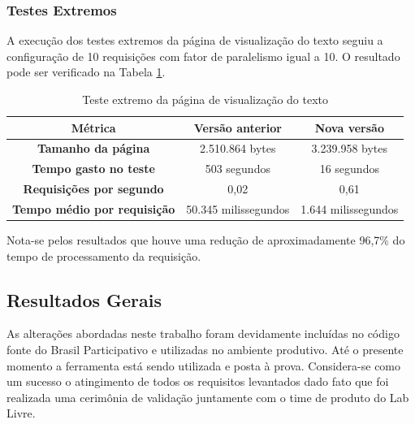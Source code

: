 \subsubsection {Testes Extremos}

A execução dos testes extremos da página de visualização do texto seguiu a configuração de 10 requisições com fator de paralelismo igual a 10.
O resultado pode ser verificado na Tabela \ref{tab:teste-carga-extremo-visualizar-texto}.

\begin{table}[h]
	\centering
	\caption{Teste extremo da página de visualização do texto}
	\label{tab:teste-carga-extremo-visualizar-texto}
	\begin{tabular}{ccc}
		\toprule
		Métrica & Versão anterior & \textbf{Nova versão} \\
		\midrule
    \textbf{Tamanho da página} & 2.510.864 bytes & 3.239.958 bytes \\
    \textbf{Tempo gasto no teste} & 503 segundos & 16 segundos \\
    \textbf{Requisições por segundo} & 0,02 & 0,61 \\
    \textbf{Tempo médio por requisição} & 50.345 milissegundos & 1.644 milissegundos \\
		\bottomrule
	\end{tabular}
\end{table}

Nota-se pelos resultados que houve uma redução de aproximadamente 96,7\% do tempo de processamento da requisição.

\subsection {Resultados Gerais}

As alterações abordadas neste trabalho foram devidamente incluídas no código fonte do Brasil Participativo e utilizadas no ambiente produtivo. Até o presente momento a ferramenta está sendo utilizada e posta à prova. Considera-se como um sucesso o atingimento de todos os requisitos levantados dado fato que foi realizada uma cerimônia de validação juntamente com o time de produto do Lab Livre.


